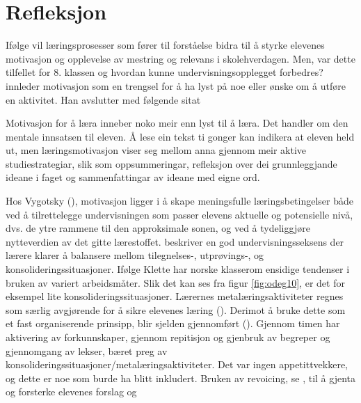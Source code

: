 \documentclass[main.tex]{subfiles}
\begin{document}
\section*{Refleksjon}
\label{sec:3}

Ifølge  vil læringsprosesser som fører til forståelse bidra til å styrke elevenes 
motivasjon og opplevelse av mestring og relevans i skolehverdagen. Men, var dette tilfellet for 8. 
klassen og hvordan kunne undervisningsopplegget forbedres?
\newline
\newline
{} innleder motivasjon som en trengsel for å ha lyst på noe eller ønske om å 
utføre en aktivitet. Han avslutter med følgende sitat
\begin{displayquote}
\guillemotleft Motivasjon for å læra inneber noko meir enn lyst til å læra. Det handler om den 
mentale innsatsen til eleven. Å lese ein tekst ti gonger kan indikera at eleven held ut, men  
læringsmotivasjon viser seg mellom anna gjennom meir aktive studiestrategiar, slik som 
oppsummeringar, refleksjon over dei grunnleggjande ideane i faget og sammenfattingar av ideane med 
eigne ord.\guillemotright 
\end{displayquote}
Hos Vygotsky (), motivasjon ligger i å skape meningsfulle læringsbetingelser 
både ved å tilrettelegge undervisningen som passer elevens aktuelle og potensielle nivå, dvs. 
de ytre rammene til den approksimale sonen, og ved å tydeliggjøre nytteverdien av det gitte 
lærestoffet. 
\newline
\newline
{} beskriver en god undervisningsseksens der lærere klarer å balansere mellom 
tilegnelses-, utprøvings-, og konsolideringssituasjoner. Ifølge Klette har norske klasserom ensidige 
tendenser i bruken av variert arbeidsmåter. Slik det kan ses fra figur \ref{fig:odeg10}, er det for 
eksempel lite konsolideringssituasjoner. Lærernes metalæringsaktiviteter regnes som særlig 
avgjørende for å sikre elevenes læring (). Derimot å bruke dette som et fast
organiserende prinsipp, blir sjelden gjennomført (). Gjennom timen har 
aktivering av forkunnskaper, gjennom repitisjon og gjenbruk av begreper og gjennomgang av 
lekser, bæret preg av konsolideringssituasjoner/metalæringsaktiviteter. Det var ingen 
appetittvekkere, og dette er noe som burde ha blitt inkludert.
\newline
\newline
Bruken av revoicing, se , til å gjenta og forsterke elevenes forslag og 
\end{document}
